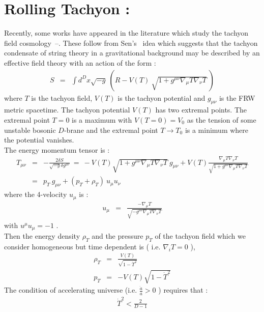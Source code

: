 \documentclass[a4paper,12pt,a4]{article}
\begin{document}
\section{Rolling Tachyon :}  
Recently, some works have appeared in the literature which 
study the tachyon field cosmology~\cite{gib1}--\cite{shiu}. 
These follow from Sen's~\cite{sen1, sen2} idea   
which suggests that the tachyon condensate of string theory in a 
gravitational background may be described by an effective field theory 
with an action of the form : 
\begin{eqnarray} 
S & = & \int d^D x \sqrt{- g}~\left( R - V(T)~\sqrt{ 1 + g^{\mu \nu} 
\nabla_{\mu} T \nabla_{\nu} T} ~  \right) 
\end{eqnarray} 
where $T$ is the tachyon field, $V(T)$ is the tachyon potential and 
$g_{\mu \nu}$ is the FRW metric spacetime. The tachyon potential $V(T)$ 
has two extremal points. The extremal point $T=0$ is a maximum with 
$V(T = 0) = V_0$ as the tension of some unstable bosonic $D$-brane and 
the extremal point $T \rightarrow T_0$ is a minimum where the 
potential vanishes. \\ 
The energy momentum tensor is :
\begin{eqnarray}
T_{\mu \nu} & = & - \frac{2 \delta S}{\sqrt{- g} \delta g^{\mu \nu}}~ = ~ 
- V(T) \sqrt{ 1 + g^{\mu \nu} \nabla_{\mu}T \nabla_{\nu} T }~ g_{\mu \nu} 
+ V(T) \frac{\nabla_{\mu} T \nabla_{\nu} T}{
\sqrt{ 1 + g^{\mu \nu} \nabla_{\mu}T \nabla_{\nu} T }}  \nonumber \\
& = & p_T~ g_{\mu \nu} + \left( p_T + \rho_T \right)~ u_{\mu} u_{\nu} 
\end{eqnarray}
where the 4-velocity $u_{\mu}$ is : 
\begin{eqnarray}
u_{\mu} & = & \frac{- \nabla_{\mu} T}{\sqrt{ - g^{\mu \nu} \nabla_{\mu} T   
\nabla_{\nu} T }}
\end{eqnarray}  
with $u^{\mu} u_{\mu} = - 1$ . \\
Then the energy density $\rho_T$ and the pressure $p_T$ of the tachyon field 
which we consider homogeneous but time dependent is ( i.e. $\nabla_i T = 0$ ), 
\begin{eqnarray} 
\rho_T & = & \frac{V(T)}{\sqrt{1 - \dot{T}^2}} \nonumber \\
p_T & = & - V(T) \sqrt{ 1 - \dot{T}^2 } 
\end{eqnarray}
The condition of accelerating universe (i.e. $\frac{\ddot{a}}{a} > 0$ ) 
requires that : 
\begin{eqnarray}
\dot{T}^2 < \frac{2}{D - 1 } 
\end{eqnarray}
\end{document}

